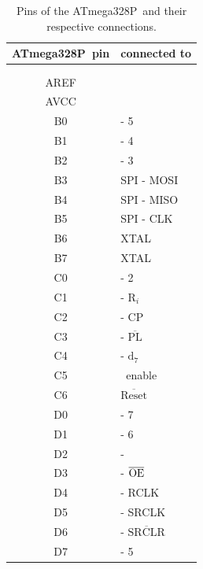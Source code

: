 \documentclass[english, parskip=half-, 11pt]{scrartcl}
\newcommand{\invertPin}[1]{$\overline{\text{#1}}$}
\newcommand{\ground}{\text{GND}}
\newcommand{\vcc}{\text{VCC}}
\newcommand{\vccPeriphery}{\text{VCCo}}
\newcommand{\serialIn}{\text{SER}}
\newcommand{\outputEnable}{\text{OE}}
\newcommand{\mosi}{MOSI}
\newcommand{\miso}{MISO}
\newcommand{\reset}{Reset}
\newcommand{\clock}{CLK}
\newcommand{\spi}{SPI}
\newcommand{\atmegathreetwoeightp}{ATmega328P}
\newcommand{\avcc}{AVCC}
\newcommand{\aref}{AREF}
\newcommand{\xtal}{XTAL}
\newcommand{\shiftRegisterName}{\text{74HC595}}
\newcommand{\shiftRegisterClockOut}{RCLK}
\newcommand{\shiftRegisterClockIn}{SRCLK}
\newcommand{\shiftRegisterClear}{SRCLR}
\newcommand{\parallelLoadName}{\text{74HC165}}
\newcommand{\parallelLoadParallelLoad}{PL}
\newcommand{\parallelLoadClock}{CP}
\newcommand{\parallelLoadInternalBit}{\text{d}}
\newcommand{\latchName}{\text{CD4043B}}
\newcommand{\latchReset}{\text{R}}
\newcommand{\additionalPinsOneName}{\text{connectorLeft}}
\newcommand{\additionalPinsTwoName}{\text{connectorRight}}
\newcommand{\devicePinConcatenation}[2]{{#1} - {#2}}
\begin{document}
\begin{table}[H]
	\centering
	\caption{Pins of the \atmegathreetwoeightp\ and their respective connections.}
	\label{tab:atmega328pConnections}
	\begin{tabular}{c|l}
		\atmegathreetwoeightp\ pin  & connected to \\\hline
		\vcc & \vcc\\
		\ground & \ground\\
		\aref & \vcc\\
		\avcc & \vcc\\
		B0 & \devicePinConcatenation{\additionalPinsOneName}{5}\\
		B1 & \devicePinConcatenation{\additionalPinsTwoName}{4}\\
		B2 & \devicePinConcatenation{\additionalPinsTwoName}{3}\\
		B3 & \devicePinConcatenation{\spi}{\mosi}\\
		B4 & \devicePinConcatenation{\spi}{\miso}\\
		B5 & \devicePinConcatenation{\spi}{\clock}\\
		B6 & \xtal\\
		B7 & \xtal\\
		C0 & \devicePinConcatenation{\additionalPinsTwoName}{2}\\
		C1 & \devicePinConcatenation{\latchName}{$\latchReset_i$}\\
		C2 & \devicePinConcatenation{\parallelLoadName}{\parallelLoadClock}\\
		C3 & \devicePinConcatenation{\parallelLoadName}{\invertPin{\parallelLoadParallelLoad}}\\
		C4 & \devicePinConcatenation{\parallelLoadName}{$\parallelLoadInternalBit_{7}$}\\
		C5 & \vccPeriphery\ enable\\
		C6 & \invertPin{\reset}\\
		D0 & \devicePinConcatenation{\additionalPinsOneName}{7}\\
		D1 & \devicePinConcatenation{\additionalPinsOneName}{6}\\
		D2 & \devicePinConcatenation{\shiftRegisterName}{\serialIn}\\
		D3 & \devicePinConcatenation{\shiftRegisterName}{\invertPin{\outputEnable}}\\
		D4 & \devicePinConcatenation{\shiftRegisterName}{\shiftRegisterClockOut}\\
		D5 & \devicePinConcatenation{\shiftRegisterName}{\shiftRegisterClockIn}\\
		D6 & \devicePinConcatenation{\shiftRegisterName}{\invertPin{\shiftRegisterClear}}\\
		D7 & \devicePinConcatenation{\additionalPinsTwoName}{5}\\
	\end{tabular}
\end{table}
\end{document}
